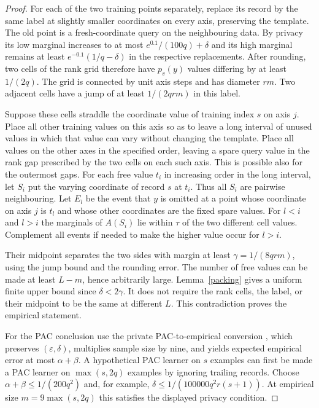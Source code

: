 \documentclass[11pt]{article}
\begin{document}
\begin{proof}
For each of the two training points separately, replace its record by the same label at slightly smaller coordinates on every axis, preserving the template. The old point is a fresh-coordinate query on the neighbouring data. By privacy its low marginal increases to at most $e^{0.1}/(100q)+\delta$ and its high marginal remains at least $e^{-0.1}(1/q-\delta)$ in the respective replacements. After rounding, two cells of the rank grid therefore have $p_v(y)$ values differing by at least $1/(2q)$. The grid is connected by unit axis steps and has diameter $rm$. Two adjacent cells have a jump of at least $1/(2qrm)$ in this label.

Suppose these cells straddle the coordinate value of training index $s$ on axis $j$. Place all other training values on this axis so as to leave a long interval of unused values in which that value can vary without changing the template. Place all values on the other axes in the specified order, leaving a spare query value in the rank gap prescribed by the two cells on each such axis. This is possible also for the outermost gaps. For each free value $t_i$ in increasing order in the long interval, let $S_i$ put the varying coordinate of record $s$ at $t_i$. Thus all $S_i$ are pairwise neighbouring. Let $E_l$ be the event that $y$ is omitted at a point whose coordinate on axis $j$ is $t_l$ and whose other coordinates are the fixed spare values. For $l<i$ and $l>i$ the marginals of $A(S_i)$ lie within $\tau$ of the two different cell values. Complement all events if needed to make the higher value occur for $l>i$.

Their midpoint separates the two sides with margin at least $\gamma=1/(8qrm)$, using the jump bound and the rounding error. The number of free values can be made at least $L-m$, hence arbitrarily large. Lemma~\ref{packing} gives a uniform finite upper bound since $\delta<2\gamma$. It does not require the rank cells, the label, or their midpoint to be the same at different $L$. This contradiction proves the empirical statement.

For the PAC conclusion use the private PAC-to-empirical conversion \cite[Lemma~8]{hmst}, which preserves $(\varepsilon,\delta)$, multiplies sample size by nine, and yields expected empirical error at most $\alpha+\beta$. A hypothetical PAC learner on $s$ examples can first be made a PAC learner on $\max(s,2q)$ examples by ignoring trailing records. Choose $\alpha+\beta\le1/(200q^2)$ and, for example, $\delta\le1/(100000q^2r(s+1))$. At empirical size $m=9\max(s,2q)$ this satisfies the displayed privacy condition.
\end{proof}
\end{document}
